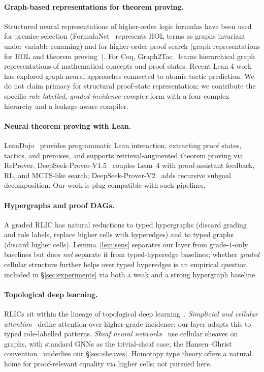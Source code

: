 \documentclass[11pt]{article}
\theoremstyle{definition}
\theoremstyle{plain}
\begin{document}
\paragraph{Graph-based representations for theorem proving.}
Structured neural representations of higher-order logic formulas have been used for premise selection (FormulaNet~\cite{wang2017formulanet} represents HOL terms as graphs invariant under variable renaming) and for higher-order proof search (graph representations for HOL and theorem proving~\cite{paliwal2020graph}). For Coq, Graph2Tac~\cite{blaauwbroek2024graph2tac} learns hierarchical graph representations of mathematical concepts and proof states. Recent Lean 4 work has explored graph-neural approaches connected to atomic tactic prediction. We do not claim primacy for structural proof-state representation; we contribute the specific \emph{role-labelled, graded incidence-complex} form with a four-complex hierarchy and a leakage-aware compiler.

\paragraph{Neural theorem proving with Lean.}
LeanDojo~\cite{yang2023leandojo} provides programmatic Lean interaction, extracting proof states, tactics, and premises, and supports retrieval-augmented theorem proving via ReProver. DeepSeek-Prover-V1.5~\cite{xin2024deepseek15} couples Lean~4 with proof-assistant feedback, RL, and MCTS-like search; DeepSeek-Prover-V2~\cite{deepseekv2} adds recursive subgoal decomposition. Our work is plug-compatible with such pipelines.

\paragraph{Hypergraphs and proof DAGs.}
A graded RLIC has natural reductions to typed hypergraphs (discard grading and role labels, replace higher cells with hyperedges) and to typed graphs (discard higher cells). Lemma~\ref{lem:sens} separates our layer from grade-$1$-only baselines but does \emph{not} separate it from typed-hyperedge baselines; whether \emph{graded} cellular structure further helps over typed hyperedges is an empirical question included in \S\ref{sec:experiments} via both a weak and a strong hypergraph baseline.

\paragraph{Topological deep learning.}
RLICs sit within the lineage of topological deep learning~\cite{hajij2022tdl}. \emph{Simplicial and cellular attention}~\cite{giusti2022simplicial,ballester2024cellular} define attention over higher-grade incidence; our layer adapts this to typed role-labelled patterns. \emph{Sheaf neural networks}~\cite{bodnar2022sheaf} use cellular sheaves on graphs, with standard GNNs as the trivial-sheaf case; the Hansen--Ghrist convention~\cite{hansenghrist2019} underlies our \S\ref{sec:sheaves}. Homotopy type theory offers a natural home for proof-relevant equality via higher cells; not pursued here.
\end{document}
